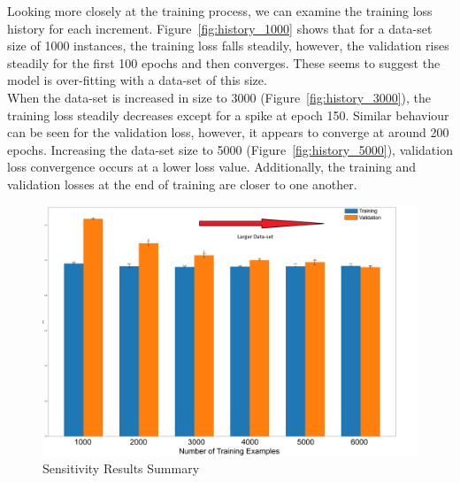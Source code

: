 \noindent Looking more closely at the training process, we can examine the training loss history for each increment. Figure~\ref{fig:history_1000} shows that for a data-set size of 1000 instances, the training loss falls steadily, however, the validation rises steadily for the first 100 epochs and then converges. These seems to suggest the model is over-fitting with a data-set of this size. \\

\noindent When the data-set is increased in size to 3000 (Figure~\ref{fig:history_3000}), the training loss steadily decreases except for a spike at epoch 150. Similar behaviour can be seen for the validation loss, however, it appears to converge at around 200 epochs. Increasing the data-set size to 5000 (Figure~\ref{fig:history_5000}), validation loss convergence occurs at a lower loss value. Additionally, the training and validation losses at the end of training are closer to one another.
\\

\begin{figure}[b]
	\centering
	\includegraphics[scale=0.14]{Figures/comparing_models_Sensitivity.png}
	\caption{Sensitivity Results Summary}
	\label{fig:sensitivity_summary}
\end{figure}

